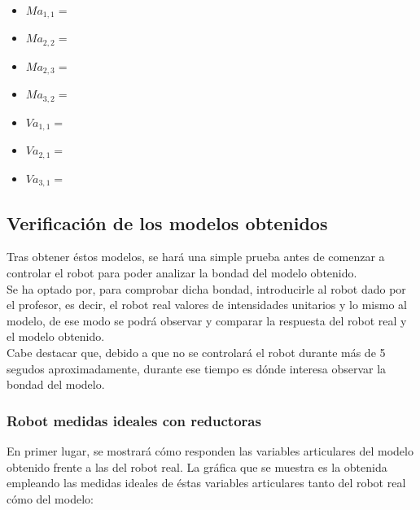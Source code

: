 {}
\begin{itemize}
	\item $ Ma_{1,1}=$ \\ \vspace{0.2cm}
	\item $ Ma_{2,2}= $ \\ \vspace{0.2cm}
	\item $ Ma_{2,3}=$ \\ \vspace{0.2cm}
	\item $ Ma_{3,2}=  $ \\ \vspace{0.2cm}
	\item $ Va_{1,1}= $ \\ \vspace{0.2cm}
	 \item $ Va_{2,1}= $ \\ \vspace{0.2cm}
	 \item $ Va_{3,1}= $
\end{itemize}


\newpage
\subsection{Verificación de los modelos obtenidos}
Tras obtener éstos modelos, se hará una simple prueba antes de comenzar a controlar el robot para poder analizar la bondad del modelo obtenido.\\
Se ha optado por, para comprobar dicha bondad, introducirle al robot dado por el profesor, es decir, el robot real valores de intensidades unitarios y lo
mismo al modelo, de ese modo se podrá observar y comparar la respuesta del robot real y el modelo obtenido.\\

Cabe destacar que, debido a que no se controlará el robot durante más de 5 segudos aproximadamente, durante ese tiempo es dónde interesa observar la bondad del modelo.
\subsubsection{Robot medidas ideales con reductoras}
En primer lugar, se mostrará cómo responden las variables articulares del modelo obtenido frente a las del robot real. La gráfica que se muestra es la obtenida empleando las medidas ideales de éstas variables articulares tanto del robot real cómo del modelo:


